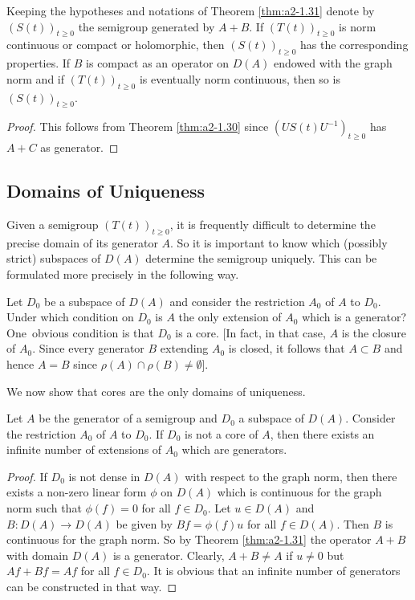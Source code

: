 \begin{corollary}\label{cor:a2-1.32}
Keeping the hypotheses and notations of Theorem \ref{thm:a2-1.31}   denote by \\ $(S(t))_{t\geq 0}$ the semigroup generated by $A+B$.
If $(T(t))_{t\geq 0}$ is norm continuous or compact or holomorphic, then $(S(t))_{t\geq 0}$ has the corresponding properties.
If $B$ is compact as an operator on $D(A)$ endowed with the graph norm and if $(T(t))_{t\geq 0}$ is eventually norm continuous, then so is $(S(t))_{t\geq 0}$.
\end{corollary}
\begin{proof}
This follows from Theorem \ref{thm:a2-1.30}   since 
$(US(t)U^{-1})_{t\geq 0}$ has $A+C$ as generator.
\end{proof}
\subsection{Domains of Uniqueness} \label{subsec:a2-1.se9}
Given a semigroup $(T(t))_{t \geq 0}$,  
it is frequently difficult to determine the precise domain of its generator $A$.
So it is important to know which (possibly strict) subspaces of $D(A)$ determine the semigroup uniquely.
This can be formulated more precisely in the following way.

Let $D_{0}$ be a subspace of $D(A)$ and consider the restriction $A_{0}$ of $A$ to $D_{0}$.
Under which condition on $D_{0}$ is $A$ the only extension of $A_{0}$ which is a generator?
One~obvious condition is that $D_{0}$ is a core.
[In fact, in that case, $A$ is the closure of $A_{0}$.
Since every generator $B$ extending $A_{0}$ is closed, it follows that $A \subset B$ and hence $A = B$ since 
$\rho(A) \cap \rho(B) \neq \emptyset$].

We now show that cores are the only domains of uniqueness.

\begin{theorem}\label{thm:a2-1.33}
Let $A$ be the generator of a semigroup and $D_{0}$ a subspace of $D(A)$.
Consider the restriction $A_{0}$ of $A$ to $D_{0}$.
If $D_{0}$ is not a core of $A$, then there exists an infinite number of extensions of $A_{0}$ which are generators.
\end{theorem}
\begin{proof}
If $D_{0}$ is not dense in $D(A)$ with respect to the graph norm, then there exists a non-zero linear form $\phi$ on $D(A)$ which is continuous for the graph norm such that $\phi(f) = 0$ for all $f \in D_{0}$. 
Let $u \in D(A)$ and $B \colon D(A) \to D(A)$ be given by $Bf = \phi(f)u$ for all $f \in D(A)$.
Then $B$ is continuous for the graph norm.
So by Theorem \ref{thm:a2-1.31}   the operator $A+B$ with domain $D(A)$ is a generator.
Clearly, $A+B \neq A$ if $u \neq 0$ but $Af+Bf = Af$ for all $f \in D_{0}$.
It is obvious that an infinite number of generators can be constructed in that way.
\end{proof}

